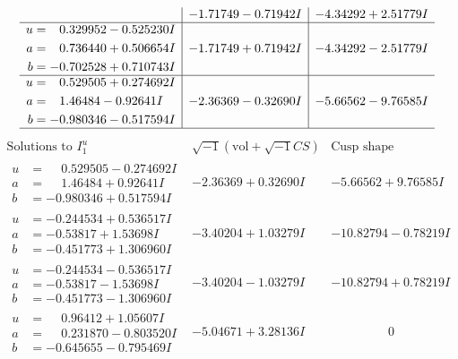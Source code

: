 \documentclass[1p]{elsarticle_modified}
\theoremstyle{definition}
\newcommand{\I}{\sqrt{-1}}
\begin{document}
$$\begin{array}{c|c|c}
 & -1.71749 - 0.71942 I & -4.34292 + 2.51779 I \\ \hline\begin{aligned}
u &= \phantom{-}0.329952 - 0.525230 I \\
a &= \phantom{-}0.736440 + 0.506654 I \\
b &= -0.702528 + 0.710743 I\end{aligned}
 & -1.71749 + 0.71942 I & -4.34292 - 2.51779 I \\ \hline\begin{aligned}
u &= \phantom{-}0.529505 + 0.274692 I \\
a &= \phantom{-}1.46484 - 0.92641 I \\
b &= -0.980346 - 0.517594 I\end{aligned}
 & -2.36369 - 0.32690 I & -5.66562 - 9.76585 I\\
 \hline 
 \end{array}$$\newpage$$\begin{array}{c|c|c}  
\text{Solutions to }I^u_{1}& \I (\text{vol} + \sqrt{-1}CS) & \text{Cusp shape}\\
 \hline 
\begin{aligned}
u &= \phantom{-}0.529505 - 0.274692 I \\
a &= \phantom{-}1.46484 + 0.92641 I \\
b &= -0.980346 + 0.517594 I\end{aligned}
 & -2.36369 + 0.32690 I & -5.66562 + 9.76585 I \\ \hline\begin{aligned}
u &= -0.244534 + 0.536517 I \\
a &= -0.53817 + 1.53698 I \\
b &= -0.451773 + 1.306960 I\end{aligned}
 & -3.40204 + 1.03279 I & -10.82794 - 0.78219 I \\ \hline\begin{aligned}
u &= -0.244534 - 0.536517 I \\
a &= -0.53817 - 1.53698 I \\
b &= -0.451773 - 1.306960 I\end{aligned}
 & -3.40204 - 1.03279 I & -10.82794 + 0.78219 I \\ \hline\begin{aligned}
u &= \phantom{-}0.96412 + 1.05607 I \\
a &= \phantom{-}0.231870 - 0.803520 I \\
b &= -0.645655 - 0.795469 I\end{aligned}
 & -5.04671 + 3.28136 I & \phantom{-0.000000 } 0 \\ \hline\begin{aligned}

\end{aligned}
\end{array}$$
\end{document}
